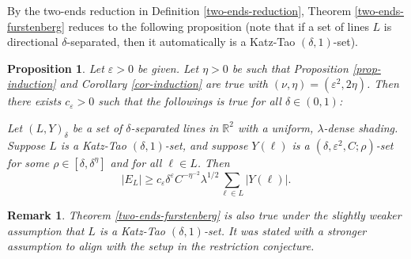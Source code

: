 \documentclass{amsart}
\numberwithin{equation}{section}
\newtheorem{proposition}[theorem]{Proposition}
\newtheorem{remark}[theorem]{Remark}
\newcommand{\de}{\delta}
\newcommand{\e}{\varepsilon}
\begin{document}
\smallskip

By the two-ends reduction in Definition \ref{two-ends-reduction}, Theorem \ref{two-ends-furstenberg} reduces to the following proposition (note that if a set of lines $L$ is directional $\de$-separated, then it automatically is a Katz-Tao $(\de,1)$-set).


\begin{proposition}
\label{two-ends-furstenberg-prop} 
Let $\e>0$ be given.
Let $\eta>0$ be such that Proposition \ref{prop-induction} and Corollary \ref{cor-induction} are true with $(\nu,\eta)=(\e^2,2\eta)$.
Then there exists $c_\e>0$ such that the followings is true for all $\delta \in (0, 1)$:

Let $(L, Y)_{\delta}$ be a set of $\delta$-separated lines in $\mathbb{R}^2$ with a uniform, $\lambda$-dense shading.
Suppose $L$ is a Katz-Tao $(\de,1)$-set, and suppose $Y(\ell)$ is a $(\de,\e^2,C;\rho)$-set for some $\rho \in [\delta, \delta^{\eta}]$ and for all $\ell\in L$.
Then
\begin{equation}
\label{main-prop-esti}
    |E_L|\geq c_{\e} \delta^{\e} C^{-\eta^{-2}} \lambda^{1/2} \sum_{\ell\in L} |Y(\ell)|. 
\end{equation}
\end{proposition}
\begin{remark}
\rm

Theorem \ref{two-ends-furstenberg} is also true under the slightly weaker assumption that $L$ is a Katz-Tao $(\de,1)$-set.
It was stated with a stronger assumption to align with the setup in the restriction conjecture.
\end{remark}


\smallskip
\end{document}

